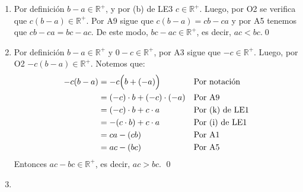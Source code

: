 \documentclass[11pt]{article}
\newcommand{\R}{\mathbb{R}}
\begin{document}
\begin{enumerate}[label=\alph*)]
\begin{enumerate}[label=\roman*)]
\begin{align*}
        &= b+d+ (-1) (a + c) && \text{Por A9}\\
        &= b+d + b-(a+c) \big) && \text{Por (h) de LE1}\\
        &= b+d - (a+c) && \text{Por notación}
        \end{align*}
    De este modo, $b+d-(a+c)\in \R^+$, es decir, $a+c<b+d$.
    \item Si $c=d$. Notemos que
        \begin{align*}
        b - a &= b -a + 0 && \text{Por A3}\\
        &= b-a+c-c && \text{Por A4}\\
        &= b+c-a-c && \text{Por A1}\\
        &= b+c+(-a)+(-c) && \text{Por notación}\\
        &= b+c+(-1)a+(-1)c && \text{Por (h) de LE1}\\
        &= b+c+(-1)(a+c) && \text{Por A9}\\
        &= b+c-(a+c) && \text{Por(h) de LE1}\\
        &= b+d-(a+c) && \text{Por hipótesis}
        \end{align*}
    De este modo, $b+d-(a+c)\in \R^+$, es decir, $a+c<b+d$.
    \end{enumerate}
    En cualquier caso, $a+c<b+d$. \qed
\item Por definición $b-a \in \R^+$, y por (b) de LE3 $c \in \R^+$. Luego, por O2 se verifica que $c(b-a) \in \R^+$. Por A9 sigue que $c(b-a)=cb-ca$ y por A5 tenemos que $cb-ca=bc-ac$. De este modo, $bc-ac \in \R^+$, es decir, $ac<bc$.\qed
\pagebreak
\item Por definición $b-a \in \R^+$ y $0 - c \in \R^+$, por A3 sigue que $ -c \in \R^+$. Luego, por O2 $-c(b-a) \in \R^+$. Notemos que:
    \begin{align*}
    -c(b-a) &= -c \Bigl( b + (-a) \Bigr) && \text{Por notación}\\
    &= (-c) \cdot b + (-c) \cdot (-a) && \text{Por A9}\\
    &= (-c) \cdot b + c \cdot a && \text{Por (k) de LE1}\\
    &= -(c \cdot b) + c \cdot a && \text{Por (i) de LE1}\\
    &= ca -(cb) && \text{Por A1}\\
    &= ac - (bc) && \text{Por A5}
    \end{align*}
Entonces $ac - bc \in \R^+$, es decir, $ac>bc$. \qed
\item
    \begin{enumerate}[label=\roman*)]

\end{enumerate}
\end{enumerate}
\end{document}
